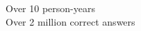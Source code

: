 \documentclass[serif,mathserif,final]{beamer}
\begin{document}
{\begin{frame}{}
\begin{columns}[t]
\begin{column}{0.32\linewidth}
\begin{block}{\rule{0pt}{1in}}
\vspace{2cm}

        Over 10 person-years\\

\vspace{2cm}
        Over 2 million correct answers

        \vspace{1.03in}
      \end{block}

    \end{column}%
 
  \end{columns}
\end{frame}
}
\end{document}
